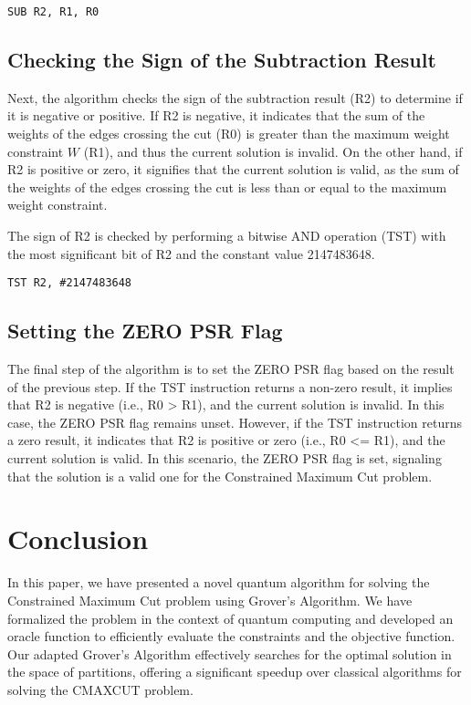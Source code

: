 \begin{verbatim}
SUB R2, R1, R0
\end{verbatim}

\subsection{Checking the Sign of the Subtraction Result}

Next, the algorithm checks the sign of the subtraction result (R2) to determine if it is negative or positive. If R2 is negative, it indicates that the sum of the weights of the edges crossing the cut (R0) is greater than the maximum weight constraint $W$ (R1), and thus the current solution is invalid. On the other hand, if R2 is positive or zero, it signifies that the current solution is valid, as the sum of the weights of the edges crossing the cut is less than or equal to the maximum weight constraint.

The sign of R2 is checked by performing a bitwise AND operation (TST) with the most significant bit of R2 and the constant value 2147483648.

\begin{verbatim}
TST R2, #2147483648
\end{verbatim}

\subsection{Setting the ZERO PSR Flag}

The final step of the algorithm is to set the ZERO PSR flag based on the result of the previous step. If the TST instruction returns a non-zero result, it implies that R2 is negative (i.e., R0 > R1), and the current solution is invalid. In this case, the ZERO PSR flag remains unset. However, if the TST instruction returns a zero result, it indicates that R2 is positive or zero (i.e., R0 <= R1), and the current solution is valid. In this scenario, the ZERO PSR flag is set, signaling that the solution is a valid one for the Constrained Maximum Cut problem.

\section{Conclusion} \label{sec:conclusion}

In this paper, we have presented a novel quantum algorithm for solving the Constrained Maximum Cut problem using Grover's Algorithm. We have formalized the problem in the context of quantum computing and developed an oracle function to efficiently evaluate the constraints and the objective function. Our adapted Grover's Algorithm effectively searches for the optimal solution in the space of partitions, offering a significant speedup over classical algorithms for solving the CMAXCUT problem.

